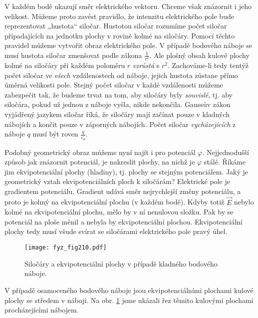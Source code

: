 {    V každém bodě ukazují směr elektrického vektoru. Chceme však znázornit i jeho velikost. Můžeme 
    proto zavést pravidlo, že intenzitu elektrického pole bude reprezentovat „hustota“ siločar. 
    Hustotou siločar rozumíme počet siločar připadajících na jednotku plochy v rovině kolmé na 
    siločáry. Pomocí těchto pravidel můžeme vytvořit obraz elektrického pole. V případě bodového 
    náboje se musí hustota siločar zmenšovat podle zákona \(\frac{1}{r^2}\). Ale plošný obsah 
    kulové plochy kolmé na siločáry při každém poloměru \(r\) \emph{vzrůstá} s \(r^2\). 
    Zachováme-li tedy tentýž počet siločar ve \emph{všech} vzdálenostech od náboje, jejich hustota 
    zůstane přímo úměrná velikosti pole. Stejný počet siločar v každé vzdálenosti můžeme zabezpečit 
    tak, že budeme trvat na tom, aby siločáry byly \emph{souvislé}, tj. aby siločára, pokud už 
    jednou z náboje vyšla, nikde nekončila. Gaussův zákon vyjádřený jazykem siločar říká, že 
    siločáry mají začínat pouze v kladných nábojích a končit pouze v záporných nábojích. Počet 
    siločar \emph{vycházejících} z náboje \(q\) musí být roven \(\frac{q}{\varepsilon_0}\).
    
    Podobný geometrický obraz můžeme nyní najít i pro potenciál \(\varphi\). Nejjednodušší způsob 
    jak znázornit potenciál, je nakreslit plochy, na nichž je \(\varphi\) stálé. Říkáme jim 
    ekvipotenciální plochy (hladiny), tj. plochy se stejným potenciálem. Jaký je geometrický vztah 
    ekvipotenciálních ploch k siločárám? Elektrické pole je gradientem potenciálu. Gradient udává 
    směr nejrychlejší změny potenciálu, a proto je kolmý na ekvipotenciální plochu (v každém bodě). 
    Kdyby totiž \(\vec{E}\) nebylo kolmé na ekvipotenciální plochu, mělo by v ní nenulovou složku. 
    Pak by se potenciál na ploše měnil a nebyla by ekvipotenciální plochou. Ekvipotenciální plochy 
    tedy musí všude svírat se siločárami elektrického pole pravý úhel.    
    \begin{figure}[ht!]
      \centering
      \texttt{[image: fyz\_fig210.pdf]}
      \caption{Siločáry a ekvipotenciální plochy v případě kladného bodového náboje.}
      \label{fyz:fig210}  
    \end{figure}
    
    V případě osamoceného bodového náboje jsou ekvipotenciálními plochami kulové plochy se středem 
    v náboji. Na obr. \ref{fyz:fig210} jsme ukázali řez těmito kulovými plochami 
    procházejícími nábojem.
    
}
